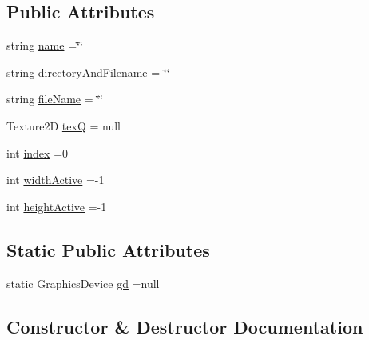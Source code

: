 \subsection*{Public Attributes}
\begin{DoxyCompactItemize}
\item 
string \mbox{\hyperlink{class_r_c___framework_1_1_r_c___texture_abc7884bbd6c745fc9fc5ff89565f3548}{name}} =\char`\"{}\char`\"{}
\item 
string \mbox{\hyperlink{class_r_c___framework_1_1_r_c___texture_a0cbd33116fd5d7a9a75b9b03b4c0ef61}{directory\+And\+Filename}} = \char`\"{}\char`\"{}
\item 
string \mbox{\hyperlink{class_r_c___framework_1_1_r_c___texture_a6f8dc0a89409e325e848fd1a7ddfdbca}{file\+Name}} = \char`\"{}\char`\"{}
\item 
Texture2D \mbox{\hyperlink{class_r_c___framework_1_1_r_c___texture_aa89de08699aa894279bdbd93179ef714}{texQ}} = null
\item 
int \mbox{\hyperlink{class_r_c___framework_1_1_r_c___texture_ab119771404aada6038d4fcface1e63b7}{index}} =0
\item 
int \mbox{\hyperlink{class_r_c___framework_1_1_r_c___texture_afebd93cc0a8c61f387d10759335d94d7}{width\+Active}} =-\/1
\item 
int \mbox{\hyperlink{class_r_c___framework_1_1_r_c___texture_a4fa2fbbe50bd32a923a4f96a93cf59e4}{height\+Active}} =-\/1
\end{DoxyCompactItemize}
\subsection*{Static Public Attributes}
\begin{DoxyCompactItemize}
\item 
static Graphics\+Device \mbox{\hyperlink{class_r_c___framework_1_1_r_c___texture_abdb88e69589307652a7eb98cb6722644}{gd}} =null
\end{DoxyCompactItemize}


\subsection{Constructor \& Destructor Documentation}
\mbox{\label{class_r_c___framework_1_1_r_c___texture_a0c6c13c129ff5e69506a72f11f774f63}} 

